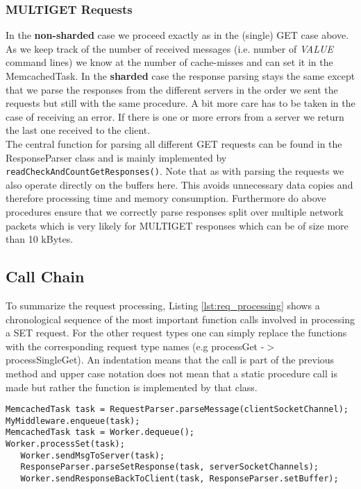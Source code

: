 \documentclass[11pt,a4paper]{article}
\let\ti\textit
\let\tb\textbf
\let\tt\texttt
\begin{document}
\subsubsection*{MULTIGET Requests}
In the \tb{non-sharded} case we proceed exactly as in the (single) GET case above. As we keep track of the number of received messages (i.e. number of \ti{VALUE} command lines) we know at the number of cache-misses and can set it in the MemcachedTask.
In the \tb{sharded} case the response parsing stays the same except that we parse the responses from the different servers in the order we sent the requests but still with the same procedure. A bit more care has to be taken in the case of receiving an error. If there is one or more errors from a server we return the last one received to the client.\\

The central function for parsing all different GET requests can be found in the ResponseParser class and is mainly implemented by \tt{readCheckAndCountGetResponses()}. Note that as with parsing the requests we also operate directly on the buffers here. This avoids unnecessary data copies and therefore processing time and memory consumption. Furthermore do above procedures ensure that we correctly parse responses split over multiple network packets which is very likely for MULTIGET responses which can be of size more than 10 kBytes. 

\subsection{Call Chain}\label{sub:reqProcessing}
To summarize the request processing, Listing \ref{lst:req_processing} shows a chronological sequence of the most important function calls involved in processing a SET request. For the other request types one can simply replace the functions with the corresponding request type names (e.g processGet -$>$ processSingleGet). An indentation means that the call is part of the previous method and upper case notation does not mean that a static procedure call is made but rather the function is implemented by that class.


\begin{lstlisting}[frame=single]
MemcachedTask task = RequestParser.parseMessage(clientSocketChannel);
MyMiddleware.enqueue(task);
MemcachedTask task = Worker.dequeue();
Worker.processSet(task);
   Worker.sendMsgToServer(task);
   ResponseParser.parseSetResponse(task, serverSocketChannels);
   Worker.sendResponseBackToClient(task, ResponseParser.setBuffer);
\end{lstlisting}
\end{document}
